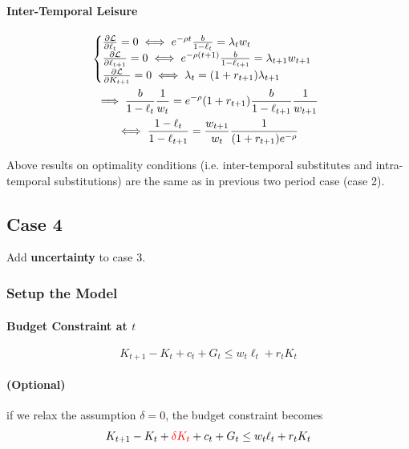 \documentclass[11pt]{article}
\begin{document}
			\paragraph{Inter-Temporal Leisure}
				\begin{gather}
					\begin{cases}
						\frac{\partial{\mathcal{{L}}}}{\partial{\ell_t}} = 0 \iff e^{-\rho t} \frac{b}{1-\ell_t} = \lambda_t w_t \\
						\frac{\partial{\mathcal{{L}}}}{\partial{\ell_{t+1}}} = 0 \iff e^{-\rho (t+1)} \frac{b}{1-\ell_{t+1}} = \lambda_{t+1} w_{t+1} \\
						\frac{\partial{\mathcal{{L}}}}{\partial{K_{t+1}}} = 0 \iff \lambda_t = (1+r_{t+1})\lambda_{t+1}
					\end{cases}\\
					\implies \frac{b}{1-\ell_t} \frac{1}{w_t} = e^{-\rho} (1+r_{t+1}) \frac{b}{1-\ell_{t+1}}\frac{1}{w_{t+1}} \\
					\iff \frac{1-\ell_{t}}{1-\ell_{t+1}} = \frac{w_{t+1}}{w_{t}} \frac{1}{(1+r_{t+1}) e^{-\rho}}
				\end{gather}
			\begin{remark}
				Above results on optimality conditions (i.e. inter-temporal substitutes and intra-temporal substitutions) are the same as in previous two period case (case 2).
			\end{remark}	
		\subsection{Case 4}
			\begin{assumption}
				Add \textbf{uncertainty} to case 3.
			\end{assumption}
		\subsubsection{Setup the Model}
			\paragraph{Budget Constraint at $t$}
			\begin{equation}
				K_{t+1} - K_t + c_t + G_t \leq w_t \ell_t + r_t K_t
			\end{equation}
			\paragraph{(Optional)} if we relax the assumption $\delta = 0$, the budget constraint becomes
			\begin{equation}
				K_{t+1} - K_t + \textcolor{red}{\delta K_t} + c_t + G_t \leq w_t \ell_t + r_t K_t
			\end{equation}
\end{document}
